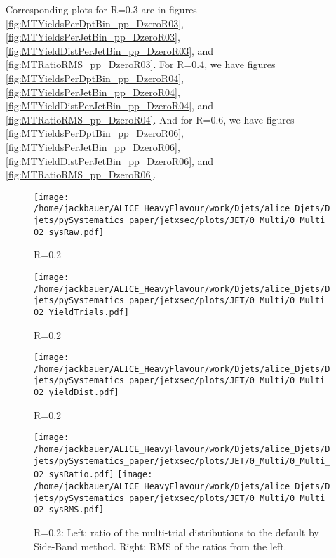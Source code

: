 Corresponding plots for R=0.3 are in figures \ref{fig:MTYieldsPerDptBin_pp_DzeroR03}, \ref{fig:MTYieldsPerJetBin_pp_DzeroR03}, \ref{fig:MTYieldDistPerJetBin_pp_DzeroR03}, and \ref{fig:MTRatioRMS_pp_DzeroR03}.
For R=0.4, we have figures \ref{fig:MTYieldsPerDptBin_pp_DzeroR04}, \ref{fig:MTYieldsPerJetBin_pp_DzeroR04}, \ref{fig:MTYieldDistPerJetBin_pp_DzeroR04}, and \ref{fig:MTRatioRMS_pp_DzeroR04}.
And for R=0.6, we have figures \ref{fig:MTYieldsPerDptBin_pp_DzeroR06}, \ref{fig:MTYieldsPerJetBin_pp_DzeroR06}, \ref{fig:MTYieldDistPerJetBin_pp_DzeroR06}, and \ref{fig:MTRatioRMS_pp_DzeroR06}.
\begin{figure}[bth]
\centering
\texttt{[image: /home/jackbauer/ALICE\_HeavyFlavour/work/Djets/alice\_Djets/Djets/pySystematics\_paper/jetxsec/plots/JET/0\_Multi/0\_Multi\_02\_sysRaw.pdf]}
\caption{R=0.2}
\label{fig:MTYieldsPerDptBin_pp_DzeroR02}
\end{figure}
\begin{figure}[bth]
\centering
\texttt{[image: /home/jackbauer/ALICE\_HeavyFlavour/work/Djets/alice\_Djets/Djets/pySystematics\_paper/jetxsec/plots/JET/0\_Multi/0\_Multi\_02\_YieldTrials.pdf]}
\caption{R=0.2
}
\label{fig:MTYieldsPerJetBin_pp_DzeroR02}
\end{figure}
\begin{figure}[bth]
\centering
\texttt{[image: /home/jackbauer/ALICE\_HeavyFlavour/work/Djets/alice\_Djets/Djets/pySystematics\_paper/jetxsec/plots/JET/0\_Multi/0\_Multi\_02\_yieldDist.pdf]}
\caption{R=0.2
}
\label{fig:MTYieldDistPerJetBin_pp_DzeroR02}
\end{figure}
\begin{figure}[bth]
\centering
\texttt{[image: /home/jackbauer/ALICE\_HeavyFlavour/work/Djets/alice\_Djets/Djets/pySystematics\_paper/jetxsec/plots/JET/0\_Multi/0\_Multi\_02\_sysRatio.pdf]}
\texttt{[image: /home/jackbauer/ALICE\_HeavyFlavour/work/Djets/alice\_Djets/Djets/pySystematics\_paper/jetxsec/plots/JET/0\_Multi/0\_Multi\_02\_sysRMS.pdf]}
\caption{R=0.2: Left: ratio of the multi-trial distributions to the default by Side-Band method. Right: RMS of the ratios from the left. 
}
\label{fig:MTRatioRMS_pp_DzeroR02}
\end{figure}

